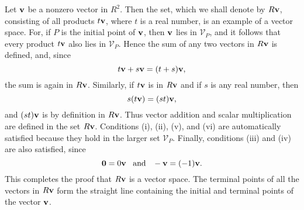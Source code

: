 \begin{example} Let $\mbox{\bf{v}}$ be a nonzero vector in $R^2$. Then the set, which we shall denote by $R\mbox{\bf{v}}$, consisting of all products $t\mbox{\bf{v}}$, where $t$ is a real number, is an example of a vector space. For, if $P$ is the initial point of $\mbox{\bf{v}}$, then $\mbox{\bf{v}}$ lies in $\mathcal{V}_P$, and it follows that every product $t\mbox{\bf{v}}$ also lies in $\mathcal{V}_P$. Hence the sum of any two vectors in $R\bf{v}$ is defined, and, since
$$
t\mbox{\bf{v}} + s\mbox{\bf{v}} = (t + s)\mbox{\bf{v}}, 
$$
\noindent the sum is again in $R\mbox{\bf{v}}$. Similarly, if $t\mbox{\bf{v}}$ is in $R\mbox{\bf{v}}$ and if $s$ is any real number, then 
$$
s(t \mbox{\bf{v}})= (st)\mbox{\bf{v}},
$$
\noindent and $(st)\mbox{\bf{v}}$ is by definition in $R\mbox{\bf{v}}$. Thus vector addition and scalar multiplication are defined in the set $R\mbox{\bf{v}}$. Conditions (i), (ii), (v), and (vi) are automatically satisfied because they hold in the larger set $\mathcal{V}_P$. 
Finally, conditions (iii) and (iv) are also satisfied, since
$$
\mbox{\bf{0}} = 0\mbox{\bf{v}} \;\;\;\mbox{and}\;\;\; - \mbox{\bf{v}} = (-1)\mbox{\bf{v}}.
$$
\noindent This completes the proof that $R\mbox{\bf{v}}$ is a vector space. The terminal points of all the vectors in $R\mbox{\bf{v}}$ form the straight line containing the initial and terminal points of the vector $\mbox{\bf{v}}$.
\end{example}

